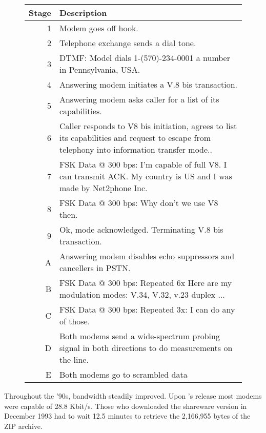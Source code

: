  \begin{figure}[H]
\centering  
\begin{tabularx}{\textwidth}{ R{0.1} L{1.9} }
  \toprule
  \textbf{Stage} &  \textbf{Description} \\
  \toprule 
   
   1 & Modem goes off hook.\\
   2 & Telephone exchange sends a dial tone.\\
   3 & DTMF: Model dials 1-(570)-234-0001 a number in Pennsylvania, USA.\\
   4 & Answering modem initiates a V.8 bis transaction.\\
   5 & Answering modem asks caller for a list of its capabilities.\\
   6 & Caller responds to V8 bis initiation, agrees to list its capabilities and request to escape from telephony into information transfer mode..\\
   7 & FSK Data @ 300 bps: I'm capable of full V8. I can transmit ACK. My country is US and I was made by Net2phone Inc.\\
   8 & FSK Data @ 300 bps: Why don't we use V8 then.\\
   9 & Ok, mode acknowledged. Terminating V.8 bis transaction.\\
   \toprule 
   A & Answering modem disables echo suppressors and cancellers in PSTN.\\
   B & FSK Data @ 300 bps: Repeated 6x Here are my modulation modes: V.34, V.32, v.23 duplex ...\\
   C & FSK Data @ 300 bps: Repeated 3x: I can do any of those. \\
   D & Both modems send a wide-spectrum probing signal in both directions to do measurements on the line.\\
   E & Both modems go to scrambled data \\
   \toprule
\end{tabularx}
\caption{}
\end{figure}
\par




Throughout the '90s, bandwidth steadily improved. Upon \doom{}'s release most modems were capable of 28.8 Kbit/s. Those who downloaded the shareware version in December 1993 had to wait 12.5 minutes to retrieve the 2,166,955 bytes of the ZIP archive.\\
\par

